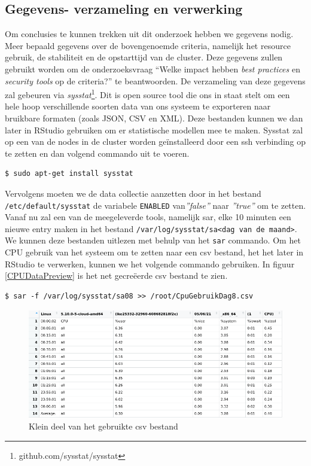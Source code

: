 \subsection{Gegevens- verzameling en verwerking} \label{ch:gegevens}
Om conclusies te kunnen trekken uit dit onderzoek hebben we gegevens nodig. Meer bepaald gegevens over de bovengenoemde criteria, namelijk het resource gebruik, de stabiliteit en de opstarttijd van de cluster. Deze gegevens zullen gebruikt worden om de onderzoeksvraag ``Welke impact hebben \textit{best practices} en \textit{security tools} op de criteria?'' te beantwoorden. De verzameling van deze gegevens zal gebeuren via \textit{sysstat}\footnote{github.com/sysstat/sysstat}. Dit is open source tool die ons in staat stelt om een hele hoop verschillende soorten data van ons systeem te exporteren naar bruikbare formaten (zoals JSON, CSV en XML). Deze bestanden kunnen we dan later in RStudio gebruiken om er statistische modellen mee te maken. Sysstat zal op een van de nodes in de cluster worden geïnstalleerd door een ssh verbinding op te zetten en dan volgend commando uit te voeren.
\begin{verbatim} 
$ sudo apt-get install sysstat
\end{verbatim}

Vervolgens moeten we de data collectie aanzetten door in het bestand \verb|/etc/default/sysstat| de variabele \verb|ENABLED| van\textit{''false''} naar \textit{''true''} om te zetten. Vanaf nu zal een van de meegeleverde tools, namelijk sar, elke 10 minuten een nieuwe entry maken in het bestand \verb|/var/log/sysstat/sa<dag van de maand>|. We kunnen deze bestanden uitlezen met behulp van het \verb|sar| commando. Om het CPU gebruik van het systeem om te zetten naar een csv bestand, het het later in RStudio te verwerken, kunnen we het volgende commando gebruiken. In figuur \ref{CPUDataPreview} is het net gecreëerde csv bestand te zien.

\begin{verbatim} 
$ sar -f /var/log/sysstat/sa08 >> /root/CpuGebruikDag8.csv
\end{verbatim}

\begin{figure}[h]
	\centering
	\includegraphics[width=\linewidth]{img/CPUDataPreview.png}
	\caption{Klein deel van het gebruikte csv bestand}
	\label{fig:CPUDataPreview}
\end{figure}


